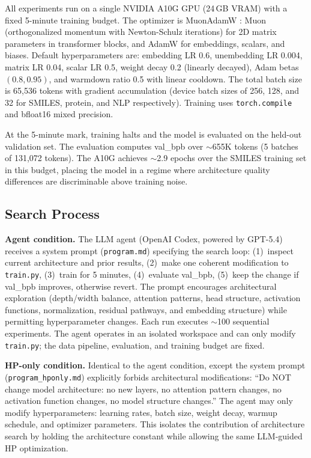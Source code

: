 All experiments run on a single NVIDIA A10G GPU (24\,GB VRAM) with a fixed 5-minute training budget. The optimizer is MuonAdamW \citep{jordan2024muon}: Muon (orthogonalized momentum with Newton-Schulz iterations) for 2D matrix parameters in transformer blocks, and AdamW for embeddings, scalars, and biases. Default hyperparameters are: embedding LR 0.6, unembedding LR 0.004, matrix LR 0.04, scalar LR 0.5, weight decay 0.2 (linearly decayed), Adam betas $(0.8, 0.95)$, and warmdown ratio 0.5 with linear cooldown. The total batch size is 65{,}536 tokens with gradient accumulation (device batch sizes of 256, 128, and 32 for SMILES, protein, and NLP respectively). Training uses \texttt{torch.compile} and bfloat16 mixed precision.

At the 5-minute mark, training halts and the model is evaluated on the held-out validation set. The evaluation computes val\_bpb over ${\sim}$655K tokens (5 batches of 131{,}072 tokens). The A10G achieves ${\sim}$2.9 epochs over the SMILES training set in this budget, placing the model in a regime where architecture quality differences are discriminable above training noise.

\subsection{Search Process}
\label{sec:search_process}

\textbf{Agent condition.}
The LLM agent (OpenAI Codex, powered by GPT-5.4) receives a system prompt (\texttt{program.md}) specifying the search loop: (1)~inspect current architecture and prior results, (2)~make one coherent modification to \texttt{train.py}, (3)~train for 5 minutes, (4)~evaluate val\_bpb, (5)~keep the change if val\_bpb improves, otherwise revert. The prompt encourages architectural exploration (depth/width balance, attention patterns, head structure, activation functions, normalization, residual pathways, and embedding structure) while permitting hyperparameter changes. Each run executes ${\sim}$100 sequential experiments. The agent operates in an isolated workspace and can only modify \texttt{train.py}; the data pipeline, evaluation, and training budget are fixed.

\textbf{HP-only condition.}
Identical to the agent condition, except the system prompt (\texttt{program\_hponly.md}) explicitly forbids architectural modifications: ``Do NOT change model architecture: no new layers, no attention pattern changes, no activation function changes, no model structure changes.'' The agent may only modify hyperparameters: learning rates, batch size, weight decay, warmup schedule, and optimizer parameters. This isolates the contribution of architecture search by holding the architecture constant while allowing the same LLM-guided HP optimization.

